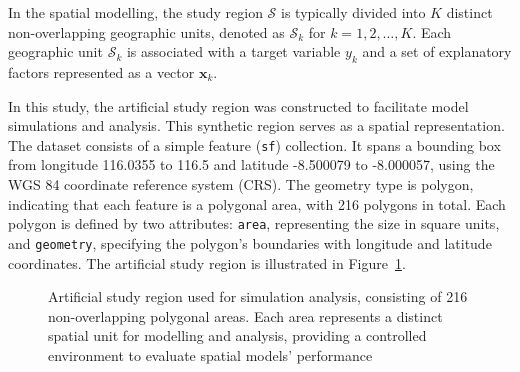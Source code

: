 \documentclass[
  default,
]{sn-jnl}
\begin{document}
In the spatial modelling, the study region \(\mathcal{S}\) is typically
divided into \(K\) distinct non-overlapping geographic units, denoted as
\(\mathcal{S}_k\) for \(k = 1, 2, \dots, K\). Each geographic unit
\(\mathcal{S}_k\) is associated with a target variable \(y_k\) and a set
of explanatory factors represented as a vector \(\mathbf{x}_k\).

In this study, the artificial study region was constructed to facilitate
model simulations and analysis. This synthetic region serves as a
spatial representation. The dataset consists of a simple feature
(\texttt{sf}) collection. It spans a bounding box from longitude
116.0355 to 116.5 and latitude -8.500079 to -8.000057, using the WGS 84
coordinate reference system (CRS). The geometry type is polygon,
indicating that each feature is a polygonal area, with 216 polygons in
total. Each polygon is defined by two attributes: \texttt{area},
representing the size in square units, and \texttt{geometry}, specifying
the polygon's boundaries with longitude and latitude coordinates. The
artificial study region is illustrated in Figure~\ref{fig-artfreg}.

\label{cell-fig-artfreg}
\begin{figure}[H]


\caption{\label{fig-artfreg}Artificial study region used for simulation
analysis, consisting of 216 non-overlapping polygonal areas. Each area
represents a distinct spatial unit for modelling and analysis, providing
a controlled environment to evaluate spatial models' performance}

\end{figure}%
\end{document}
